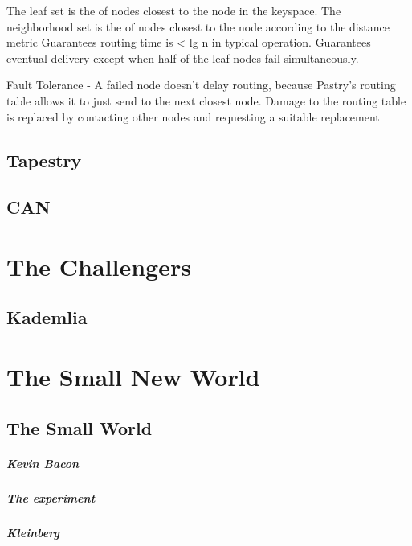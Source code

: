 \documentclass[10pt,letterpaper]{report}
\begin{document}
The leaf set is the  of nodes closest to the node in the keyspace.  The neighborhood set is the  of nodes closest to the node according to the distance metric
Guarantees  routing time is  < lg n in typical operation.  Guarantees eventual delivery except when half of the leaf nodes fail simultaneously.


Fault Tolerance -  A failed node doesn't delay  routing, because Pastry's routing table allows it to just send to the next closest node.  Damage to the routing table is replaced by contacting other nodes and requesting a suitable replacement


\section{Tapestry}

\section{CAN}




\chapter{The Challengers}

\section{Kademlia}


\chapter{The Small New World}

\section{The Small World}

\paragraph{Kevin Bacon}
\paragraph{The experiment}
\paragraph{Kleinberg}
\end{document}

